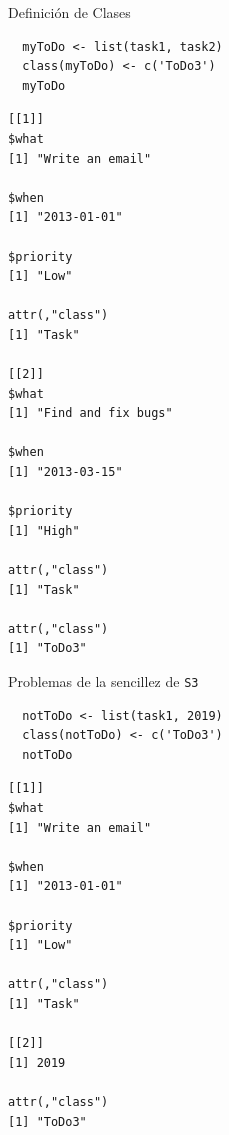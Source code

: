 \documentclass[xcolor={usenames,svgnames,dvipsnames}]{beamer}
\begin{document}
\begin{frame}[label={sec:orgd0d65e6},fragile]{Definición de Clases}
 \lstset{language=r,label= ,caption= ,captionpos=b,numbers=none}
\begin{lstlisting}
  myToDo <- list(task1, task2)
  class(myToDo) <- c('ToDo3')
  myToDo
\end{lstlisting}

\begin{verbatim}
[[1]]
$what
[1] "Write an email"

$when
[1] "2013-01-01"

$priority
[1] "Low"

attr(,"class")
[1] "Task"

[[2]]
$what
[1] "Find and fix bugs"

$when
[1] "2013-03-15"

$priority
[1] "High"

attr(,"class")
[1] "Task"

attr(,"class")
[1] "ToDo3"
\end{verbatim}
\end{frame}

\begin{frame}[label={sec:orgf159753},fragile]{Problemas de la sencillez de \texttt{S3}}
 \lstset{language=r,label= ,caption= ,captionpos=b,numbers=none}
\begin{lstlisting}
  notToDo <- list(task1, 2019)
  class(notToDo) <- c('ToDo3')
  notToDo
\end{lstlisting}

\begin{verbatim}
[[1]]
$what
[1] "Write an email"

$when
[1] "2013-01-01"

$priority
[1] "Low"

attr(,"class")
[1] "Task"

[[2]]
[1] 2019

attr(,"class")
[1] "ToDo3"
\end{verbatim}
\end{frame}
\end{document}
